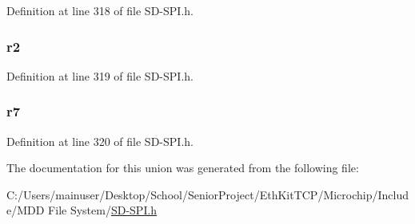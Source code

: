 Definition at line 318 of file S\+D-\/\+S\+P\+I.\+h.

\hypertarget{union_m_m_c___r_e_s_p_o_n_s_e_aab48d3dd48cf0f86a44ef72c120d02a1}{}
\subsubsection[{r2}]{ r2}\label{union_m_m_c___r_e_s_p_o_n_s_e_aab48d3dd48cf0f86a44ef72c120d02a1}


Definition at line 319 of file S\+D-\/\+S\+P\+I.\+h.

\hypertarget{union_m_m_c___r_e_s_p_o_n_s_e_a189db65c90218c9863a21cf9dcb74824}{}
\subsubsection[{r7}]{ r7}\label{union_m_m_c___r_e_s_p_o_n_s_e_a189db65c90218c9863a21cf9dcb74824}


Definition at line 320 of file S\+D-\/\+S\+P\+I.\+h.



The documentation for this union was generated from the following file\+:\begin{DoxyCompactItemize}
\item 
C\+:/\+Users/mainuser/\+Desktop/\+School/\+Senior\+Project/\+Eth\+Kit\+T\+C\+P/\+Microchip/\+Include/\+M\+D\+D File System/\hyperlink{_s_d-_s_p_i_8h}{S\+D-\/\+S\+P\+I.\+h}\end{DoxyCompactItemize}
